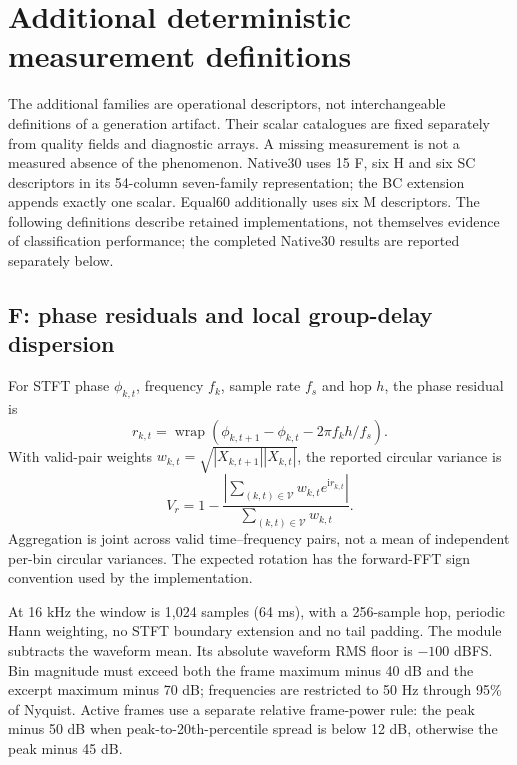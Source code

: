 \section{Additional deterministic measurement definitions}
\label{sec:additional-measurements}

The additional families are operational descriptors, not interchangeable
definitions of a generation artifact. Their scalar catalogues are fixed
separately from quality fields and diagnostic arrays. A missing measurement
is not a measured absence of the phenomenon. Native30 uses 15 F, six H and
six SC descriptors in its 54-column seven-family representation; the BC
extension appends exactly one scalar. Equal60 additionally uses six M
descriptors. The following definitions describe retained implementations,
not themselves evidence of classification performance; the completed Native30 results are reported separately below.

\subsection{F: phase residuals and local group-delay dispersion}
For STFT phase $\phi_{k,t}$, frequency $f_k$, sample rate $f_s$ and hop $h$,
the phase residual is
\begin{equation}
 r_{k,t}=\operatorname{wrap}\left(\phi_{k,t+1}-\phi_{k,t}
                 -2\pi f_kh/f_s\right).
\end{equation}
With valid-pair weights $w_{k,t}=\sqrt{|X_{k,t+1}||X_{k,t}|}$,
the reported circular variance is
\begin{equation}
 V_r=1-\frac{\left|\sum_{(k,t)\in\mathcal V}
                     w_{k,t}e^{\mathrm{i}r_{k,t}}\right|}
                    {\sum_{(k,t)\in\mathcal V}w_{k,t}}.
\end{equation}
Aggregation is joint across valid time--frequency pairs, not a mean of
independent per-bin circular variances. The expected rotation has the
forward-FFT sign convention used by the implementation.

At 16 kHz the window is 1,024 samples (64 ms), with a 256-sample hop,
periodic Hann weighting, no STFT boundary extension and no tail padding.
The module subtracts the waveform mean. Its absolute waveform RMS floor
is $-100$ dBFS. Bin magnitude must exceed both the frame maximum minus
40 dB and the excerpt maximum minus 70 dB; frequencies are restricted to
50 Hz through 95\% of Nyquist. Active frames use a separate relative
frame-power rule: the peak minus 50 dB when peak-to-20th-percentile spread
is below 12 dB, otherwise the peak minus 45 dB.

